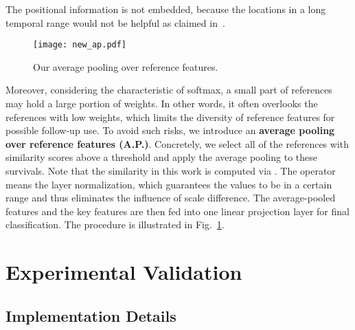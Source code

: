 \documentclass[letterpaper]{article} \usepackage{aaai23}  \usepackage{times}  \usepackage{helvet}  \usepackage{courier}  \usepackage[hyphens]{url}  \usepackage{graphicx} \urlstyle{rm} \def\UrlFont{\rm}  \usepackage{natbib}  \usepackage{caption} \usepackage{xcolor}
\begin{document}
The positional information is not embedded, because the locations in a long temporal range would not be helpful as claimed in~\cite{chen2020memory}.

 
\begin{figure}[t]
\centering
\texttt{[image: new\_ap.pdf]}
\caption{Our average pooling over reference features.}
\label{fig:ave pooling fig}
\end{figure}

Moreover, considering the characteristic of softmax, a small part of references may hold a large portion of weights. In other words, it often overlooks the references with low weights, which limits the diversity of reference features for possible follow-up use. To avoid such risks, we introduce an \textbf{average pooling over reference features (A.P.)}. Concretely, we select all of the references with similarity scores above a threshold  and apply the average pooling to these survivals. Note that the similarity in this work is computed via . The operator  means the layer normalization, which guarantees the values to be in a certain range and thus eliminates the influence of scale difference.
The average-pooled features and the key features are then fed into one linear projection layer for final classification. The procedure is illustrated in Fig.~\ref{fig:ave pooling fig}. 

\section{Experimental Validation}

\subsection{Implementation Details}
\end{document}
